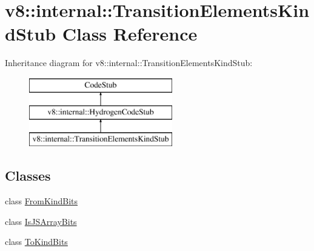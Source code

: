 \hypertarget{classv8_1_1internal_1_1_transition_elements_kind_stub}{}\section{v8\+:\+:internal\+:\+:Transition\+Elements\+Kind\+Stub Class Reference}
\label{classv8_1_1internal_1_1_transition_elements_kind_stub}
Inheritance diagram for v8\+:\+:internal\+:\+:Transition\+Elements\+Kind\+Stub\+:\begin{figure}[H]
\begin{center}
\leavevmode
\includegraphics[height=3.000000cm]{classv8_1_1internal_1_1_transition_elements_kind_stub}
\end{center}
\end{figure}
\subsection*{Classes}
\begin{DoxyCompactItemize}
\item 
class \hyperlink{classv8_1_1internal_1_1_transition_elements_kind_stub_1_1_from_kind_bits}{From\+Kind\+Bits}
\item 
class \hyperlink{classv8_1_1internal_1_1_transition_elements_kind_stub_1_1_is_j_s_array_bits}{Is\+J\+S\+Array\+Bits}
\item 
class \hyperlink{classv8_1_1internal_1_1_transition_elements_kind_stub_1_1_to_kind_bits}{To\+Kind\+Bits}
\end{DoxyCompactItemize}
